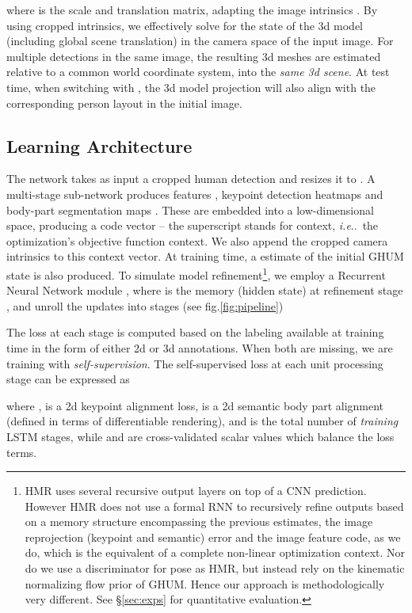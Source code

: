 \documentclass[final]{cvpr}
\makeatletter
\DeclareRobustCommand\onedot{\futurelet\@let@token\@onedot}
\def\@onedot{\ifx\@let@token.\else.\null\fi\xspace}
\def\ie{\emph{i.e}\onedot} \def\Ie{\emph{I.e}\onedot}
\makeatother
\begin{document}
where  is the scale and translation matrix, adapting the image intrinsics . By using cropped intrinsics, we effectively solve for the state of the 3d model (including global scene translation) in the camera space of the input image. For multiple detections in the same image, the resulting 3d meshes are estimated relative to a common world coordinate system, into the \textit{same 3d scene}. At test time, when switching  with , the 3d model projection will also align with the corresponding person layout in the initial image.

\subsection{Learning Architecture}\label{sec:learn-arch}

The network takes as input a cropped human detection and resizes it to . A multi-stage sub-network produces features , keypoint detection heatmaps  and body-part segmentation maps . These are embedded into a low-dimensional space, producing a code vector  -- the superscript  stands for context, \ie\ the optimization’s objective function context. We also append the cropped camera intrinsics  to this context vector. At training time, a estimate  of the initial GHUM state  is also produced.
To simulate model refinement\footnote{HMR\cite{Kanazawa2018} uses several  recursive output layers on top of a CNN prediction. However HMR does not use a formal RNN to recursively refine outputs based on a memory structure encompassing the previous estimates, the image reprojection (keypoint and semantic) error and the image feature code, as we do, which is the equivalent of a complete non-linear optimization context. Nor do we use a discriminator for pose as HMR, but instead rely on the kinematic normalizing flow prior of GHUM. Hence our approach is methodologically very different. See \S\ref{sec:exps} for quantitative evaluation. }, we employ a Recurrent Neural Network module , where   is the memory (hidden state) at refinement stage , and unroll the updates into  stages (see fig.\ref{fig:pipeline})

The loss at each stage  is computed based on the labeling available at training time in the form of either 2d or 3d annotations. When both are missing, we are training with \textit{self-supervision}.  The self-supervised loss at each unit processing stage  can be expressed as

where ,  is a 2d keypoint alignment loss,  is a 2d semantic body part alignment (defined in terms of differentiable rendering), and  is the total number of \textit{training} LSTM stages, while  and  are cross-validated scalar values which balance the loss terms.
\end{document}
